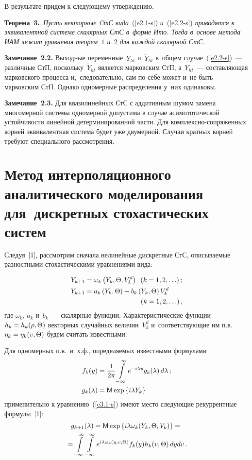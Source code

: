 \begin{multicols}{2}
В результате придем к следующему утверж\-дению.

\smallskip

\noindent
\textbf{Теорема~3.}\
\textit{Пусть векторные CтС вида}~(\ref{e2.1-s}) \textit{и}~(\ref{e2.2-s}) 
\textit{приводятся к эквивалентной системе скалярных СтС в~форме Ито. Тогда  
в~основе метода ИАМ лежат уравнения теорем~$1$ и~$2$ для каждой скалярной СтС.}


\smallskip

\noindent
\textbf{Замечание~2.2.}
Выходные переменные~$Y_{ht}$ и~$\tilde Y_{ht}$ в~общем случае~(\ref{e2.2-s})~--- 
различные СтП, поскольку~$ \tilde Y_{ht}$ является марковским СтП,
а~$Y_{ht}$~--- со\-став\-ля\-ющая марковского процесса и,~следовательно, 
сам по себе может и~не быть марковским СтП. Однако одномерные распределения 
у~них одинаковы.

\smallskip

\noindent
\textbf{Замечание~2.3.}
Для квазилинейных СтС с аддитивным шумом замена многомерной системы одномерной 
допустима в случае асимптотической устойчивости линейной детерминированной части. 
Для комп\-лекс\-но-со\-пря\-жен\-ных корней эквивалентная система будет уже двумерной. 
Случаи кратных корней требуют специального рассмотрения.


\section{Метод интерполяционного 
аналитического моделирования для~дискретных стохастических систем}

Следуя~[1], рассмотрим сначала нелинейные дискретные СтС, описываемые 
разностными стохастическими уравнениями вида:

\noindent
\begin{align}
Y_{k+1} &=\omega_k \left(Y_k, \Theta, V_k^d\right) \enskip (k=1,2,\ldots)\,;\label{e3.1-s}
\\
Y_{k+1} &=a_k \left(Y_k, \Theta\right) +b_k \left(Y_k, \Theta\right)V_k^d \notag\\ 
&\hspace*{29mm}(k=1,2,\ldots)\,,\label{e3.2-s}
\end{align}
где $\omega_k$, $a_k$ и~$b_k$~--- скалярные функции. Характеристические функции 
$h_k\hm=h_k (\rho, \Theta)$ векторных случайных величин~$V_k^d$ и~соответствующие им
 п.в.\ $\eta_k \hm= \eta_k(v,\Theta)$ будем считать известными.

Для одномерных п.в.\ и~х.ф., определяемых известными формулами
\begin{align*}
f_k (y) &=\displaystyle\displaystyle\frac{\displaystyle 1\mathstrut}{\displaystyle 2\pi\mathstrut} \int\limits_{-\infty}^\infty 
e^{-i\lambda y} g_k (\lambda) \,d\lambda\,; \\
g_k(\lambda) &=      {\sf M} \exp \left\{ i \lambda Y_k\right\}
\end{align*}
применительно к уравнению~(\ref{e3.1-s}) имеют место следующие рекуррентные формулы~[1]:
\begin{multline}
g_{k+1} (\lambda) = {\sf M} \exp \left\{ i\lambda \omega_k (Y_k, \Theta, V_k) \right\} = {}\\
{}=
    \int\limits_{-\infty}^\infty \int\limits_{-\infty}^\infty e^{i\lambda \omega_k (y, v,\Theta)} 
    f_k (y) h_k ( v,\Theta)\, dy dv\,.\label{e3.4-s}
    \end{multline}


\end{multicols}
